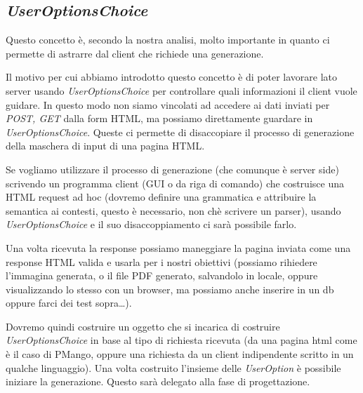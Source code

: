 \subsection{\emph{UserOptionsChoice}}
Questo concetto \`e, secondo la nostra analisi, molto importante in quanto ci
permette di astrarre dal client che richiede una generazione.

Il motivo per cui abbiamo introdotto questo concetto \`e di poter lavorare lato
server usando \emph{UserOptionsChoice} per controllare quali informazioni il
client vuole guidare. In questo modo non siamo vincolati ad accedere ai dati
inviati per \emph{POST, GET} dalla form HTML, ma possiamo direttamente guardare
in \emph{UserOptionsChoice}. Queste ci permette di disaccopiare il processo di
generazione della maschera di input di una pagina HTML. 

Se vogliamo utilizzare il processo di generazione (che comunque \`e
server side) scrivendo un programma client (GUI o da riga di comando) che
costruisce una HTML request ad hoc (dovremo definire una grammatica e
attribuire la semantica ai contesti, questo \`e necessario, non ch\`e scrivere 
un parser), usando \emph{UserOptionsChoice} e il suo disaccoppiamento ci sar\`a
possibile farlo. 

Una volta ricevuta la response possiamo maneggiare la pagina
inviata come una response HTML valida e usarla per i nostri obiettivi (possiamo
rihiedere l'immagina generata, o il file PDF generato, salvandolo in
locale, oppure visualizzando lo stesso con un browser, ma possiamo anche
inserire in un db oppure farci dei test sopra\ldots).

Dovremo quindi costruire un oggetto che si incarica di costruire
\emph{UserOptionsChoice} in base al tipo di richiesta ricevuta (da una pagina
html come \`e il caso di PMango, oppure una richiesta da un client indipendente
scritto in un qualche linguaggio). Una volta costruito l'insieme delle
\emph{UserOption} \`e possibile iniziare la generazione. Questo sar\`a delegato
alla fase di progettazione.
